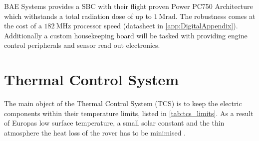 BAE Systems provides a SBC with their flight proven Power PC750 Architecture which withstands a total radiation dose of up to $1~\text{Mrad}$. The robustness comes at the cost of a $182~\text{MHz}$ processor speed (datasheet in \autoref{app:DigitalAppendix}). \\

Additionally a custom housekeeping board will be tasked with providing engine control peripherals and sensor read out electronics. 

\section{Thermal Control System} \label{sec:thermalcontrol}
The main object of the Thermal Control System (TCS) is to keep the electric components within their temperature limits, listed in \autoref{tab:tcs_limits}.
As a result of Europas low surface temperature, a small solar constant and the thin atmosphere the heat loss of the rover has to be minimised  \cite{Europa}.

